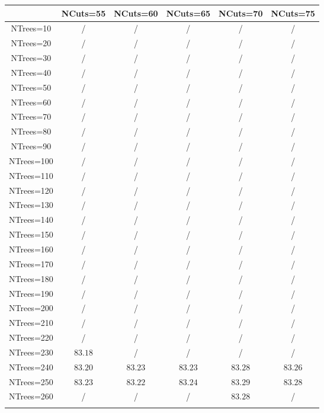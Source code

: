 \centering
\begin{tabular}{cccccc} \toprule\toprule
 & NCuts=55 & NCuts=60 & NCuts=65 & NCuts=70 & NCuts=75\\\midrule
NTrees=10 &  / &  / &  / &  / &  /\\
NTrees=20 &  / &  / &  / &  / &  /\\
NTrees=30 &  / &  / &  / &  / &  /\\
NTrees=40 &  / &  / &  / &  / &  /\\
NTrees=50 &  / &  / &  / &  / &  /\\
NTrees=60 &  / &  / &  / &  / &  /\\
NTrees=70 &  / &  / &  / &  / &  /\\
NTrees=80 &  / &  / &  / &  / &  /\\
NTrees=90 &  / &  / &  / &  / &  /\\
NTrees=100 &  / &  / &  / &  / &  /\\
NTrees=110 &  / &  / &  / &  / &  /\\
NTrees=120 &  / &  / &  / &  / &  /\\
NTrees=130 &  / &  / &  / &  / &  /\\
NTrees=140 &  / &  / &  / &  / &  /\\
NTrees=150 &  / &  / &  / &  / &  /\\
NTrees=160 &  / &  / &  / &  / &  /\\
NTrees=170 &  / &  / &  / &  / &  /\\
NTrees=180 &  / &  / &  / &  / &  /\\
NTrees=190 &  / &  / &  / &  / &  /\\
NTrees=200 &  / &  / &  / &  / &  /\\
NTrees=210 &  / &  / &  / &  / &  /\\
NTrees=220 &  / &  / &  / &  / &  /\\
NTrees=230 & $83.18$ &  / &  / &  / &  /\\
NTrees=240 & $83.20$ & $83.23$ & $83.23$ & $83.28$ & $83.26$\\
NTrees=250 & $83.23$ & $83.22$ & $83.24$ & $83.29$ & $83.28$\\
NTrees=260 &  / &  / &  / & $83.28$ &  /\\
\bottomrule\bottomrule\\
\end{tabular}
